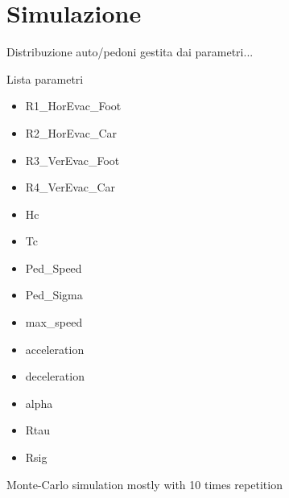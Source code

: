 \section{Simulazione}

Distribuzione auto/pedoni gestita dai parametri...

Lista parametri

\begin{itemize}
  \item R1\_HorEvac\_Foot
  \item R2\_HorEvac\_Car
  \item R3\_VerEvac\_Foot
  \item R4\_VerEvac\_Car
  \item Hc
  \item Tc
  \item Ped\_Speed
  \item Ped\_Sigma
  \item max\_speed
  \item acceleration
  \item deceleration
  \item alpha
  \item Rtau
  \item Rsig
\end{itemize}

Monte-Carlo simulation mostly with 10 times repetition
